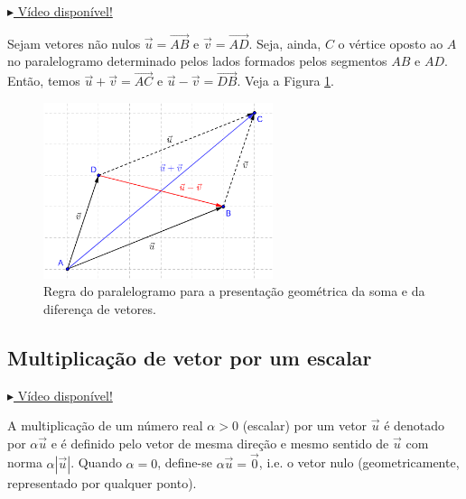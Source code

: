 \begin{obs}\label{obs:vetor_regra_do_paralelogramo}
  \begin{flushright}
    \href{https://archive.org/details/regra-do-paralelogramo}{$\blacktriangleright$ Vídeo disponível!}
  \end{flushright}

  Sejam vetores não nulos $\vec{u} = \overrightarrow{AB}$ e $\vec{v} = \overrightarrow{AD}$. Seja, ainda, $C$ o vértice oposto ao $A$ no paralelogramo determinado pelos lados formados pelos segmentos $AB$ e $AD$. Então, temos $\vec{u} + \vec{v} = \overrightarrow{AC}$ e $\vec{u}-\vec{v} = \overrightarrow{DB}$. Veja a Figura \ref{fig:regrapara}.

\begin{figure}[H]
  \centering
  \includegraphics[width=0.6\textwidth]{./cap_vetor/dados/fig_regrapara/fig_regrapara}
  \caption{Regra do paralelogramo para a presentação geométrica da soma e da diferença de vetores.}
  \label{fig:regrapara}
\end{figure}  
\end{obs}

\subsection{Multiplicação de vetor por um escalar}

\begin{flushright}
  \href{https://archive.org/details/multiplicacao-vetor-por-escalar}{$\blacktriangleright$ Vídeo disponível!}
\end{flushright}

A multiplicação de um número real $\alpha>0$ (escalar) por um vetor $\vec{u}$ é denotado por $\alpha\vec{u}$ e é definido pelo vetor de mesma direção e mesmo sentido de $\vec{u}$ com norma $\alpha|\vec{u}|$. Quando $\alpha = 0$, define-se $\alpha\vec{u}=\vec{0}$, i.e. o vetor nulo (geometricamente, representado por qualquer ponto).

